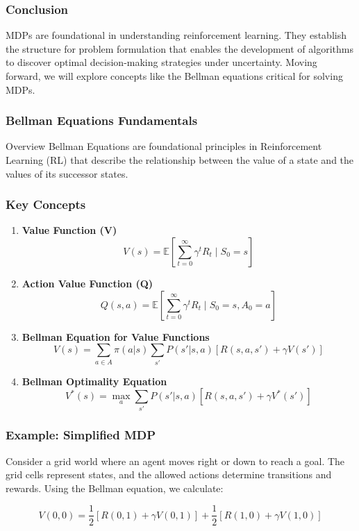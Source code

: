 \documentclass{beamer}
\begin{document}
\begin{frame}[fragile]
    \frametitle{Conclusion}
    MDPs are foundational in understanding reinforcement learning. They establish the structure for problem formulation that enables the development of algorithms to discover optimal decision-making strategies under uncertainty. Moving forward, we will explore concepts like the Bellman equations critical for solving MDPs.
\end{frame}

\begin{frame}[fragile]
    \frametitle{Bellman Equations Fundamentals}

    \begin{block}{Overview}
        Bellman Equations are foundational principles in Reinforcement Learning (RL) that describe the relationship between the value of a state and the values of its successor states.
    \end{block}
    
\end{frame}

\begin{frame}[fragile]
    \frametitle{Key Concepts}

    \begin{enumerate}
        \item \textbf{Value Function (V)}  
        \[
        V(s) = \mathbb{E}\left[\sum_{t=0}^{\infty} \gamma^t R_t \mid S_0 = s\right]
        \]
        
        \item \textbf{Action Value Function (Q)}  
        \[
        Q(s, a) = \mathbb{E}\left[\sum_{t=0}^{\infty} \gamma^t R_t \mid S_0 = s, A_0 = a\right]
        \]
        
        \item \textbf{Bellman Equation for Value Functions}  
        \[
        V(s) = \sum_{a \in A} \pi(a|s) \sum_{s'} P(s'|s, a) \left[R(s, a, s') + \gamma V(s')\right]
        \]
        
        \item \textbf{Bellman Optimality Equation}  
        \[
        V^*(s) = \max_{a} \sum_{s'} P(s'|s, a) \left[R(s, a, s') + \gamma V^*(s')\right]
        \]
    \end{enumerate}
    
\end{frame}

\begin{frame}[fragile]
    \frametitle{Example: Simplified MDP}

    Consider a grid world where an agent moves right or down to reach a goal. The grid cells represent states, and the allowed actions determine transitions and rewards. Using the Bellman equation, we calculate:
    
    \[
    V(0,0) = \frac{1}{2} \left[R(0,1) + \gamma V(0,1)\right] + \frac{1}{2} \left[R(1,0) + \gamma V(1,0)\right]
    \]
    
\end{frame}
\end{document}
